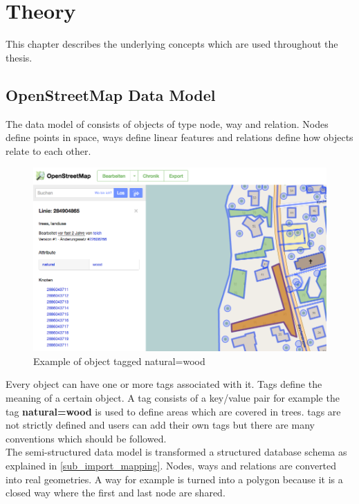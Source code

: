 \chapter{Theory}

This chapter describes the underlying concepts which are used throughout the thesis. 

\section{OpenStreetMap Data Model}\label{openstreetmap_data_model}

The data model of \osm{} consists of objects of type node, way and relation. Nodes define points in space, ways define linear features and relations define how objects relate to each other\cite{1_osm_wiki_2016}.

\begin{figure}[H]
    \centering
    \includegraphics[width=1\textwidth]{images/osm_data_model}
    \caption{Example of object tagged natural=wood}
    \label{landuse_on_osm_editor}
\end{figure}

Every object can have one or more tags associated with it. Tags define the meaning of a certain object. A tag consists of a key/value pair for example the tag \textbf{natural=wood} is used to define areas which are covered in trees. \osm{} tags are not strictly defined and users can add their own tags but there are many conventions which should be followed.\\

The semi-structured \osm{} data model is transformed a structured database schema as explained in \autoref{sub_import_mapping}. Nodes, ways and relations are converted into real geometries.
A way for example is turned into a polygon because it is a closed way where the first and last node are shared\cite{13_osm_wiki_closed_way}.

